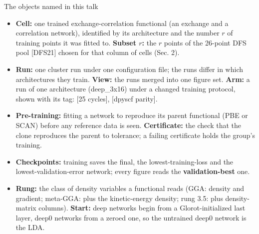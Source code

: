 \begin{frame}{The objects named in this talk}
  \small
  \begin{itemize}
    \item \textbf{Cell:} one trained exchange-correlation functional (an exchange and a correlation network), identified by its architecture and the number $r$ of training points it was fitted to. \textbf{Subset $r$:} the $r$ points of the 26-point DFS pool [DFS21] chosen for that column of cells (Sec. 2).
    \item \textbf{Run:} one cluster run under one configuration file; the runs differ in which architectures they train. \textbf{View:} the runs merged into one figure set. \textbf{Arm:} a run of one architecture (deep\_3x16) under a changed training protocol, shown with its tag: [25 cycles], [dpyscf parity].
    \item \textbf{Pre-training:} fitting a network to reproduce its parent functional (PBE or SCAN) before any reference data is seen. \textbf{Certificate:} the check that the clone reproduces the parent to tolerance; a failing certificate holds the group's training.
    \item \textbf{Checkpoints:} training saves the final, the lowest-training-loss and the lowest-validation-error network; every figure reads the \textbf{validation-best} one.
    \item \textbf{Rung:} the class of density variables a functional reads (GGA: density and gradient; meta-GGA: plus the kinetic-energy density; rung 3.5: plus density-matrix columns). \textbf{Start:} deep networks begin from a Glorot-initialized last layer, deep0 networks from a zeroed one, so the untrained deep0 network is the LDA.
  \end{itemize}
\end{frame}
